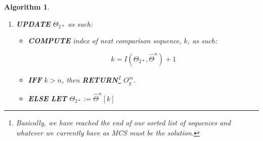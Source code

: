 \documentclass[a4paper, 18pt]{book} %
\newtheorem{alg}{Algorithm}
\newcommand{\invpi}{\rotatebox[origin=c]{180}{$\pi$}}
\begin{document}
\begin{alg}
\begin{enumerate}
{\begin{enumerate}
{\begin{itemize}
{ \vspace{1em}
\begin{equation}
f(\Theta_m[i],\Theta_{2*}[i]) = \begin{cases}
\Theta_m[i] & \Theta_m[i] == \Theta_{2*}[i],\\
0 & \Theta_m[i] \neq \Theta_{2*}[i]
\end{cases}
\end{equation}
 \vspace{1em}
 
 
 }
 \item \textbf{TRUNCATE}  $O^\phi$ to its longest non-zero/non-empty subsequence, and \textbf{SET} that as $\bar{O^\phi}$.
 \item \textbf{IFF}  $\invpi(\bar{O^\phi}) > \invpi(O^m_g)$, then \textbf{UPDATE} or replace $O^m_g$ with $\bar{O^\phi}$\\ $\implies$  $O^m_g := \bar{O^\phi}$
 \end{itemize}
}
\item{
\textbf{UPDATE}  $j \implies j := j + z$
}
\item {
\textbf{IFF}  $j = \invpi(\Theta_m) + \invpi(\Theta_{2*})$, then \textbf{GOTO}\footnote{At this juncture, we shall have essentially finished sliding the second sequence, $\Theta_{2*}$, past all the elements of the first sequence so that at $j = \invpi(\Theta_m) + \invpi(\Theta_{2*})$ there is nomore overlap possible, and so we can move on to the next sequence.} \textbf{Step\#9}
}
\item{\textbf{ELSE} \textbf{ITERATE}  from \textbf{Step\#c}}
\end{enumerate}
}

\item{ \textbf{UPDATE} $\Theta_{2*}$ as such:

\begin{itemize}
\item{ \textbf{COMPUTE} index of next comparison sequence, $k$, as such: 

\vspace{1em}
\begin{equation}
k = I(\Theta_{2*},{\hat{\Theta}}^n) + 1
\end{equation}
\vspace{1em}

}
\item \textbf{IFF} $k > n$, then \textbf{RETURN}\footnote{Basically, we have reached the end of our sorted list of sequences and whatever we currently have as MCS must be the solution.}  $O^m_g$.
\item \textbf{ELSE} \textbf{LET} $\Theta_{2*} := {\hat{\Theta}}^n[k]$


\end{itemize}}
\end{enumerate}
\end{alg}
\end{document}

